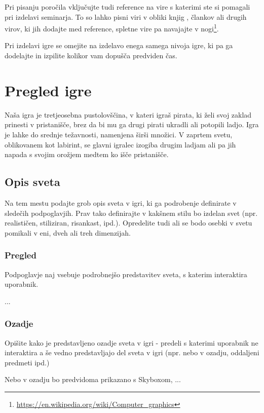 \documentclass[a4paper]{article}
\begin{document}
Pri pisanju poročila vključujte tudi reference na vire s katerimi ste si pomagali pri izdelavi seminarja. To so lahko pisni viri v obliki knjig \cite{Foley1994}, člankov \cite{Meng2015} ali drugih virov, ki jih dodajte med reference, spletne vire pa navajajte v nogi\footnote{\url{https://en.wikipedia.org/wiki/Computer_graphics}}.

Pri izdelavi igre se omejite na izdelavo enega samega nivoja igre, ki pa ga dodelajte in izpilite kolikor vam do\-pu\-šča predviden čas.




\section{Pregled igre}
Naša igra je tretjeosebna pustolovščina, v kateri igraš pirata, ki želi svoj zaklad prinesti v pristanišče, brez da bi mu ga drugi pirati ukradli ali potopili ladjo. Igra je lahke do srednje težavnosti, namenjena širši množici. V zaprtem svetu, oblikovanem kot labirint, se glavni igralec izogiba drugim ladjam ali pa jih napada s svojim orožjem medtem ko išče pristanišče.

\subsection{Opis sveta}
Na tem mestu podajte grob opis sveta v igri, ki ga podrobenje definirate v sledečih podpoglavjih. Prav tako definirajte v kakšnem stilu bo izdelan svet (npr. realističen, stiliziran, risankast, ipd.). Opredelite tudi ali se bodo osebki v svetu pomikali v eni, dveh ali treh dimenzijah.

\subsubsection{Pregled}
Podpoglavje naj vsebuje podrobnejšo predstavitev sveta, s katerim interaktira uporabnik.

...

\subsubsection{Ozadje}
Opišite kako je predstavljeno ozadje sveta v igri - predeli s katerimi uporabnik ne interaktira a še vedno predstavljajo del sveta v igri (npr. nebo v ozadju, oddaljeni predmeti ipd.)

Nebo v ozadju bo predvidoma prikazano s Skyboxom, ...
\end{document}
